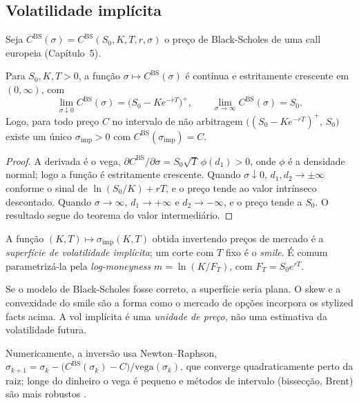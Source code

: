 \subsection{Volatilidade implícita}

Seja $C^{\mathrm{BS}}(\sigma)=C^{\mathrm{BS}}(S_0,K,T,r,\sigma)$ o preço de Black-Scholes de uma call europeia (Capítulo~5).

\begin{proposicao}\label{prop:volimp}
Para $S_0,K,T>0$, a função $\sigma\mapsto C^{\mathrm{BS}}(\sigma)$ é contínua e estritamente crescente em $(0,\infty)$, com
\begin{equation}
\lim_{\sigma\downarrow0}C^{\mathrm{BS}}(\sigma)=\big(S_0-Ke^{-rT}\big)^+,\qquad \lim_{\sigma\to\infty}C^{\mathrm{BS}}(\sigma)=S_0.
\end{equation}
Logo, para todo preço $C$ no intervalo de não arbitragem $\big((S_0-Ke^{-rT})^+,\,S_0\big)$ existe um único $\sigma_{\mathrm{imp}}>0$ com $C^{\mathrm{BS}}(\sigma_{\mathrm{imp}})=C$.
\end{proposicao}

\begin{proof}
A derivada é o vega, $\partial C^{\mathrm{BS}}/\partial\sigma=S_0\sqrt T\,\phi(d_1)>0$, onde $\phi$ é a densidade normal; logo a função é estritamente crescente. Quando $\sigma\downarrow0$, $d_{1},d_2\to\pm\infty$ conforme o sinal de $\ln(S_0/K)+rT$, e o preço tende ao valor intrínseco descontado. Quando $\sigma\to\infty$, $d_1\to+\infty$ e $d_2\to-\infty$, e o preço tende a $S_0$. O resultado segue do teorema do valor intermediário.
\end{proof}

\begin{definicao}
A função $(K,T)\mapsto\sigma_{\mathrm{imp}}(K,T)$ obtida invertendo preços de mercado é a \emph{superfície de volatilidade implícita}; um corte com $T$ fixo é o \emph{smile}. É comum parametrizá-la pela \emph{log-moneyness} $m=\ln(K/F_T)$, com $F_T=S_0e^{rT}$.
\end{definicao}

\begin{observacao}
Se o modelo de Black-Scholes fosse correto, a superfície seria plana. O skew e a convexidade do smile são a forma como o mercado de opções incorpora os stylized facts acima. A vol implícita é uma \emph{unidade de preço}, não uma estimativa da volatilidade futura.
\end{observacao}

Numericamente, a inversão usa Newton–Raphson, $\sigma_{k+1}=\sigma_k-\big(C^{\mathrm{BS}}(\sigma_k)-C\big)/\mathrm{vega}(\sigma_k)$, que converge quadraticamente perto da raiz; longe do dinheiro o vega é pequeno e métodos de intervalo (bissecção, Brent) são mais robustos \citep{gatheral2006}.

